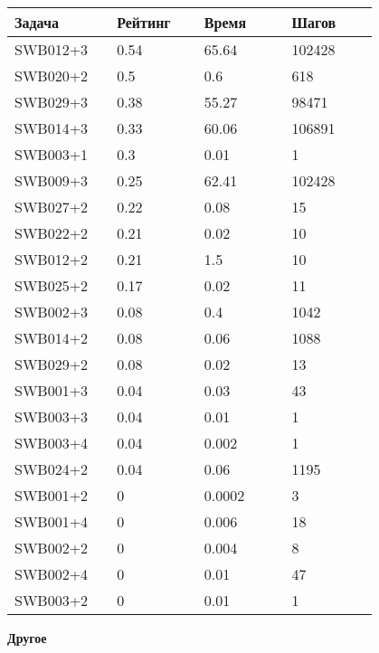 \begin{longtable}[H]{|p{0.2\linewidth}|p{0.2\linewidth}|p{0.2\linewidth}|p{0.2\linewidth}|}
\hline
\textbf{Задача} & \textbf{Рейтинг} & \textbf{Время} & \textbf{Шагов} \\
\hline
SWB012+3 &  0.54 &  65.64 &  102428 \\
\hline
SWB020+2 &  0.5 &  0.6 &  618 \\
\hline
SWB029+3 &  0.38 &  55.27 &  98471 \\
\hline
SWB014+3 &  0.33 &  60.06 &  106891 \\
\hline
SWB003+1 &  0.3 &  0.01 &  1 \\
\hline
SWB009+3 &  0.25 &  62.41 &  102428 \\
\hline
SWB027+2 &  0.22 &  0.08 &  15 \\
\hline
SWB022+2 &  0.21 &  0.02 &  10 \\
\hline
SWB012+2 &  0.21 &  1.5 &  10 \\
\hline
SWB025+2 &  0.17 &  0.02 &  11 \\
\hline
SWB002+3 &  0.08 &  0.4 &  1042 \\
\hline
SWB014+2 &  0.08 &  0.06 &  1088 \\
\hline
SWB029+2 &  0.08 &  0.02 &  13 \\
\hline
SWB001+3 &  0.04 &  0.03 &  43 \\
\hline
SWB003+3 &  0.04 &  0.01 &  1 \\
\hline
SWB003+4 &  0.04 &  0.002 &  1 \\
\hline
SWB024+2 &  0.04 &  0.06 &  1195 \\
\hline
SWB001+2 &  0 &  0.0002 &  3 \\
\hline
SWB001+4 &  0 &  0.006 &  18 \\
\hline
SWB002+2 &  0 &  0.004 &  8 \\
\hline
SWB002+4 &  0 &  0.01 &  47 \\
\hline
SWB003+2 &  0 &  0.01 &  1 \\
\hline
\end{longtable}




\textbf{Другое}


